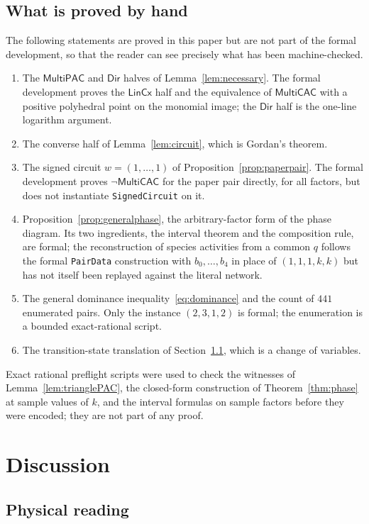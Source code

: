 \documentclass[11pt,a4paper]{article}
\theoremstyle{plain}
\theoremstyle{definition}
\theoremstyle{remark}
\newcommand{\MPAC}{\mathsf{MultiPAC}}
\newcommand{\MCAC}{\mathsf{MultiCAC}}
\newcommand{\DIR}{\mathsf{Dir}}
\newcommand{\LIN}{\mathsf{LinCx}}
\newcommand{\lean}[1]{\texttt{#1}}
\begin{document}
\subsection{What is proved by hand}\label{sec:notformal}

The following statements are proved in this paper but are not part of the formal development, so that the reader can see precisely what has been machine-checked.
\begin{enumerate}
\item The $\MPAC$ and $\DIR$ halves of Lemma~\ref{lem:necessary}. The formal development proves the $\LIN$ half and the equivalence of $\MCAC$ with a positive polyhedral point on the monomial image; the $\DIR$ half is the one-line logarithm argument.
\item The converse half of Lemma~\ref{lem:circuit}, which is Gordan's theorem.
\item The signed circuit $w=(1,\dots,1)$ of Proposition~\ref{prop:paperpair}. The formal development proves $\neg\MCAC$ for the paper pair directly, for all factors, but does not instantiate \lean{SignedCircuit} on it.
\item Proposition~\ref{prop:generalphase}, the arbitrary-factor form of the phase diagram. Its two ingredients, the interval theorem and the composition rule, are formal; the reconstruction of species activities from a common $q$ follows the formal \lean{PairData} construction with $b_0,\dots,b_4$ in place of $(1,1,1,k,k)$ but has not itself been replayed against the literal network.
\item The general dominance inequality~\eqref{eq:dominance} and the count of $441$ enumerated pairs. Only the instance $(2,3,1,2)$ is formal; the enumeration is a bounded exact-rational script.
\item The transition-state translation of Section~\ref{sec:physics}, which is a change of variables.
\end{enumerate}
Exact rational preflight scripts were used to check the witnesses of Lemma~\ref{lem:trianglePAC}, the closed-form construction of Theorem~\ref{thm:phase} at sample values of $k$, and the interval formulas on sample factors before they were encoded; they are not part of any proof.

\section{Discussion}\label{sec:discussion}

\subsection{Physical reading}\label{sec:physics}
\end{document}
